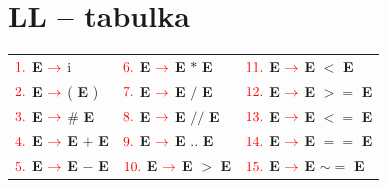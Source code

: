 \documentclass[a4paper, 11pt]{article}
\newcommand{\arrow} {$\color{red} \rightarrow$\space}
\begin{document}
    \section*{LL -- tabulka}
    \newcommand{\bE}{\textbf{E}}
    \begin{table}[!htbp]
        \centering
        \begin{tabular}{l@{\hskip 1in} l@{\hskip 1in} l}
            $\color{red} 1.$ \bE{} \space\arrow{} i               & $\color{red} 6.$  \bE{} \space\arrow{} \bE{} $*$ \bE{}  & $\color{red} 11.$ \bE{} \space\arrow{} \bE{} $<$ \bE{}     \\
            $\color{red} 2.$ \bE{} \space\arrow{} ( \bE{} )         & $\color{red} 7.$  \bE{} \space\arrow{} \bE{} $/$ \bE{}  & $\color{red} 12.$ \bE{} \space\arrow{} \bE{} $>=$ \bE{}    \\
            $\color{red} 3.$ \bE{} \space\arrow{} \# \bE{}         & $\color{red} 8.$  \bE{} \space\arrow{} \bE{} $//$ \bE{} & $\color{red} 13.$ \bE{} \space\arrow{} \bE{} $<=$ \bE{}    \\
            $\color{red} 4.$ \bE{} \space\arrow{} \bE{} $+$ \bE{} & $\color{red} 9.$  \bE{} \space\arrow{} \bE{} .. \bE{}   & $\color{red} 14.$ \bE{} \space\arrow{} \bE{} $==$ \bE{}    \\
            $\color{red} 5.$ \bE{} \space\arrow{} \bE{} $-$ \bE{} & $\color{red} 10.$ \bE{} \space\arrow{} \bE{} $>$ \bE{}  & $\color{red} 15.$ \bE{} \space\arrow{} \bE{} $\sim=$ \bE{} \\
        \end{tabular}
    \end{table}
\end{document}
